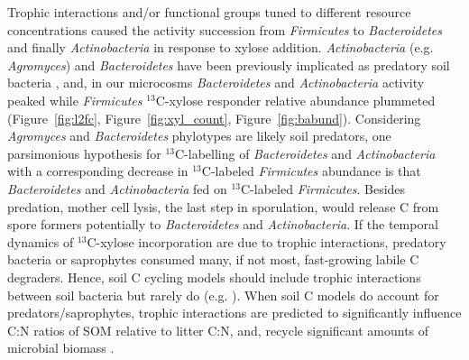 Trophic interactions and/or functional groups tuned to different resource
concentrations caused the activity succession from \textit{Firmicutes} to
\textit{Bacteroidetes} and finally \textit{Actinobacteria} in response to
xylose addition. \textit{Actinobacteria} (e.g. \textit{Agromyces}) and
\textit{Bacteroidetes} have been previously implicated as predatory soil
bacteria \citep{Lueders2006,16346402}, and,  in our microcosms
\textit{Bacteroidetes} and \textit{Actinobacteria} activity peaked  while
\textit{Firmicutes} $^{13}$C-xylose responder relative abundance plummeted
(Figure~\ref{fig:l2fc}, Figure~\ref{fig:xyl_count},
Figure~\ref{fig:babund}). Considering \textit{Agromyces} and
\textit{Bacteroidetes} phylotypes are likely soil predators, one parsimonious
hypothesis for $^{13}$C-labelling of \textit{Bacteroidetes} and
\textit{Actinobacteria} with a corresponding decrease in $^{13}$C-labeled
\textit{Firmicutes} abundance is that \textit{Bacteroidetes} and
\textit{Actinobacteria} fed on $^{13}$C-labeled \textit{Firmicutes}. Besides
predation, mother cell lysis, the last step in sporulation, would release
C from spore formers potentially to \textit{Bacteroidetes} and
\textit{Actinobacteria}. If the temporal dynamics of $^{13}$C-xylose
incorporation are due to trophic interactions, predatory bacteria or
saprophytes consumed many, if not most, fast-growing labile C degraders. Hence,
soil C cycling models should include trophic interactions between soil bacteria
but rarely do (e.g. \citep{Moore1988}). When soil C models do account for
predators/saprophytes, trophic interactions are predicted to significantly
influence C:N ratios of SOM relative to litter C:N, and, recycle significant
amounts of microbial biomass \citep{Kaiser2014a}.

